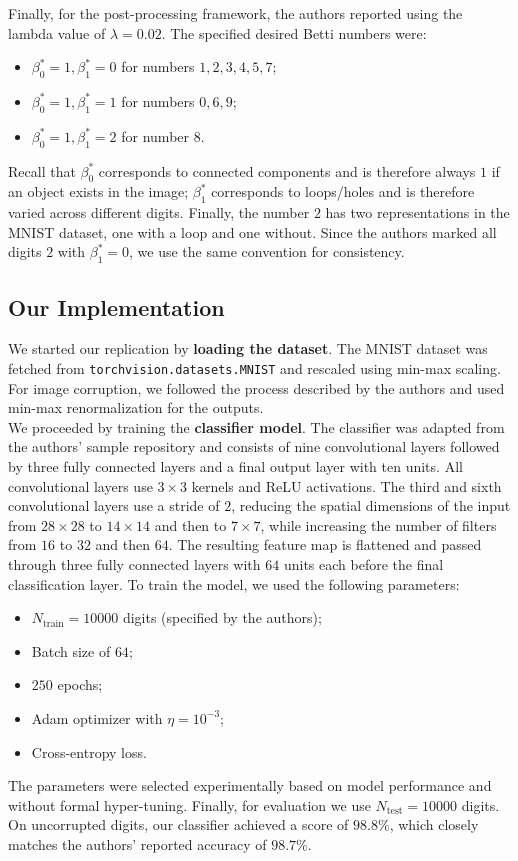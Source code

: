 Finally, for the post-processing framework, the authors reported using the lambda value of $\lambda=0.02$. The specified desired Betti numbers were:
\begin{itemize}
  \item $\beta^*_0 = 1, \beta^*_1 = 0$ for numbers $1, 2, 3, 4, 5, 7$;
  \item $\beta^*_0 = 1, \beta^*_1 = 1$ for numbers $0, 6, 9$;
  \item $\beta^*_0 = 1, \beta^*_1 = 2$ for number $8$.
\end{itemize}
Recall that $\beta^*_0$ corresponds to connected components and is therefore always $1$ if an object exists in the image; $\beta^*_1$ corresponds to loops/holes and is therefore varied across different digits. Finally, the number $2$ has two representations in the MNIST dataset, one with a loop and one without. Since the authors marked all digits $2$ with $\beta^*_1 = 0$, we use the same convention for consistency. \\

\subsection{Our Implementation}

We started our replication by \textbf{loading the dataset}. The MNIST dataset was fetched from \texttt{torchvision.datasets.MNIST} and rescaled using min-max scaling. For image corruption, we followed the process described by the authors and used min-max renormalization for the outputs. \\

We proceeded by training the \textbf{classifier model}. The classifier was adapted from the authors' sample repository\supercite{Repo_mnist} and consists of nine convolutional layers followed by three fully connected layers and a final output layer with ten units. All convolutional layers use $3\times3$ kernels and ReLU activations. The third and sixth convolutional layers use a stride of $2$, reducing the spatial dimensions of the input from $28\times28$ to $14\times14$ and then to $7\times7$, while increasing the number of filters from $16$ to $32$ and then $64$. The resulting feature map is flattened and passed through three fully connected layers with $64$ units each before the final classification layer. To train the model, we used the following parameters:
\begin{itemize}
  \item $N_\text{train}=10000$ digits (specified by the authors);
  \item Batch size of $64$;
  \item $250$ epochs;
  \item Adam optimizer with $\eta=10^{-3}$;
  \item Cross-entropy loss.
\end{itemize}
The parameters were selected experimentally based on model performance and without formal hyper-tuning. Finally, for evaluation we use $N_\text{test}=10000$ digits. On uncorrupted digits, our classifier achieved a score of $98.8\%$, which closely matches the authors' reported accuracy of $98.7\%$. \\

